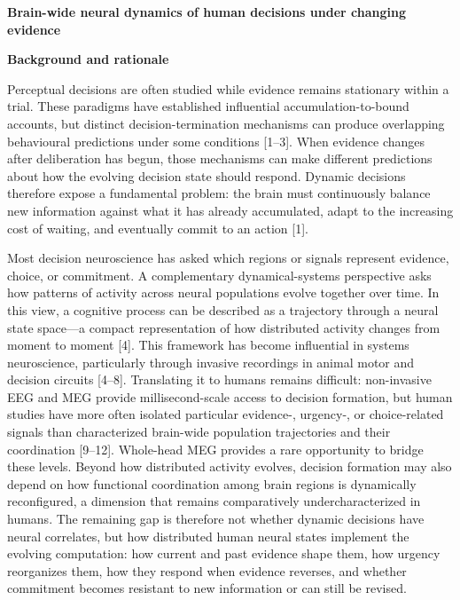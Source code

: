 \documentclass[12pt,letterpaper]{article}
\newcommand{\proposalheading}[1]{\begin{center}\textbf{#1}\end{center}\vspace{-4pt}}
\newcommand{\nsercsection}[1]{\Needspace{2\baselineskip}\vspace{3pt}\noindent\textbf{#1}\par\vspace{0pt}}
\newcommand{\citep}[1]{[#1]}
\begin{document}
\proposalheading{Brain-wide neural dynamics of human decisions under changing evidence}

\nsercsection{Background and rationale}
Perceptual decisions are often studied while evidence remains stationary within a trial. These paradigms have established influential accumulation-to-bound accounts, but distinct decision-termination mechanisms can produce overlapping behavioural predictions under some conditions \citep{1--3}. When evidence changes after deliberation has begun, those mechanisms can make different predictions about how the evolving decision state should respond. Dynamic decisions therefore expose a fundamental problem: the brain must continuously balance new information against what it has already accumulated, adapt to the increasing cost of waiting, and eventually commit to an action \citep{1}.

Most decision neuroscience has asked which regions or signals represent evidence, choice, or commitment. A complementary dynamical-systems perspective asks how patterns of activity across neural populations evolve together over time. In this view, a cognitive process can be described as a trajectory through a neural state space---a compact representation of how distributed activity changes from moment to moment \citep{4}. This framework has become influential in systems neuroscience, particularly through invasive recordings in animal motor and decision circuits \citep{4--8}. Translating it to humans remains difficult: non-invasive EEG and MEG provide millisecond-scale access to decision formation, but human studies have more often isolated particular evidence-, urgency-, or choice-related signals than characterized brain-wide population trajectories and their coordination \citep{9--12}. Whole-head MEG provides a rare opportunity to bridge these levels. Beyond how distributed activity evolves, decision formation may also depend on how functional coordination among brain regions is dynamically reconfigured, a dimension that remains comparatively undercharacterized in humans. The remaining gap is therefore not whether dynamic decisions have neural correlates, but how distributed human neural states implement the evolving computation: how current and past evidence shape them, how urgency reorganizes them, how they respond when evidence reverses, and whether commitment becomes resistant to new information or can still be revised.
\end{document}
